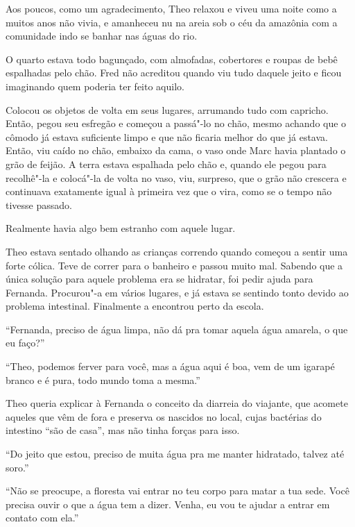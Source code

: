 Aos poucos, como um agradecimento, Theo relaxou e viveu uma noite como a
muitos anos não vivia, e amanheceu nu na areia sob o céu da amazônia com a
comunidade indo se banhar nas águas do rio.

\asterisc


O quarto estava todo bagunçado, com almofadas, cobertores e roupas de
bebê espalhadas pelo chão. Fred não acreditou quando viu tudo daquele
jeito e ficou imaginando quem poderia ter feito aquilo.

Colocou os objetos de volta em seus lugares, arrumando tudo com
capricho. Então, pegou seu esfregão e começou a passá"-lo no chão, mesmo
achando que o cômodo já estava suficiente limpo e que não ficaria melhor
do que já estava. Então, viu caído no chão, embaixo da cama, o vaso onde
Marc havia plantado o grão de feijão. A terra estava espalhada pelo chão
e, quando ele pegou para recolhê"-la e colocá"-la de volta no vaso, viu,
surpreso, que o grão não crescera e continuava exatamente igual à
primeira vez que o vira, como se o tempo não tivesse passado.

Realmente havia algo bem estranho com aquele lugar.

\asterisc


Theo estava sentado olhando as
crianças correndo quando começou a sentir uma forte cólica. Teve de
correr para o banheiro e passou muito mal. Sabendo que a única solução
para aquele problema era se hidratar, foi pedir ajuda para Fernanda.
Procurou"-a em vários lugares, e já estava se sentindo tonto devido ao
problema intestinal. Finalmente a encontrou perto da escola.

``Fernanda, preciso de água limpa, não dá pra tomar aquela água amarela,
o que eu faço?''

``Theo, podemos ferver para você, mas a água aqui é boa, vem de um
igarapé branco e é pura, todo mundo toma a mesma.''

Theo queria explicar à Fernanda o conceito da diarreia do viajante, que
acomete aqueles que vêm de fora e preserva os nascidos no local, cujas
bactérias do intestino ``são de casa'', mas não tinha forças para isso.

``Do jeito que estou, preciso de muita água pra me manter hidratado,
talvez até soro.''

``Não se preocupe, a floresta vai entrar no teu corpo para matar a tua
sede. Você precisa ouvir o que a água tem a dizer. Venha, eu vou te
ajudar a entrar em contato com ela.''

